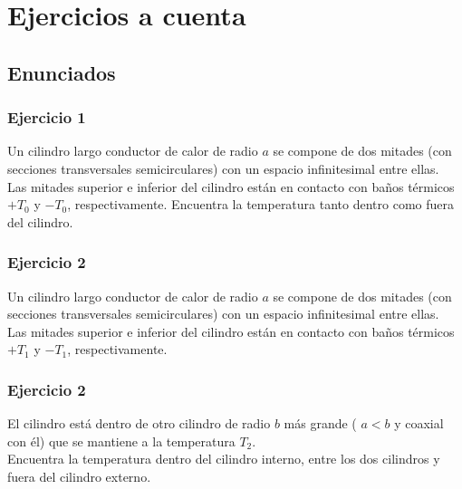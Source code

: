 \documentclass[12pt]{beamer}
\begin{document}
\section{Ejercicios a cuenta}
\subsection{Enunciados}

\begin{frame}
\frametitle{Ejercicio 1}
Un cilindro largo conductor de calor de radio $a$ se compone de dos mitades (con secciones transversales semicirculares) con un espacio infinitesimal entre ellas.
\\
\bigskip
\pause
Las mitades superior e inferior del cilindro están en contacto con baños térmicos $+T_{0}$ y $-T_{0}$, respectivamente. Encuentra la temperatura tanto dentro como fuera del cilindro.
\end{frame}
\begin{frame}
\frametitle{Ejercicio 2}
Un cilindro largo conductor de calor de radio $a$ se compone de dos mitades (con secciones transversales semicirculares) con un espacio infinitesimal entre ellas.
\\
\bigskip
Las mitades superior e inferior del cilindro están en contacto con baños térmicos $+T_{1}$ y $-T_{1}$, respectivamente.
\end{frame}
\begin{frame}
\frametitle{Ejercicio 2}
El cilindro está dentro de otro cilindro de radio $b$ más grande ( $a < b$ y coaxial con él) que se mantiene a la temperatura $T_{2}$.
\\
\bigskip
\pause
Encuentra la temperatura dentro del cilindro interno, entre los dos cilindros y fuera del cilindro externo.
\end{frame}
\end{document}

